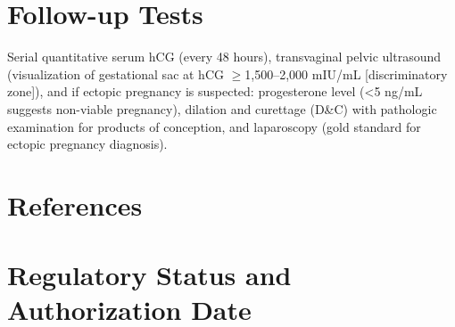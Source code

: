 \section*{Follow-up Tests}
Serial quantitative serum hCG (every 48 hours), transvaginal pelvic ultrasound (visualization of gestational sac at hCG $\geq$1,500--2,000 mIU/mL [discriminatory zone]), and if ectopic pregnancy is suspected: progesterone level (<5 ng/mL suggests non-viable pregnancy), dilation and curettage (D\&C) with pathologic examination for products of conception, and laparoscopy (gold standard for ectopic pregnancy diagnosis).
\section*{References}



\clearpage
\section*{Regulatory Status and Authorization Date}

\clearpage
